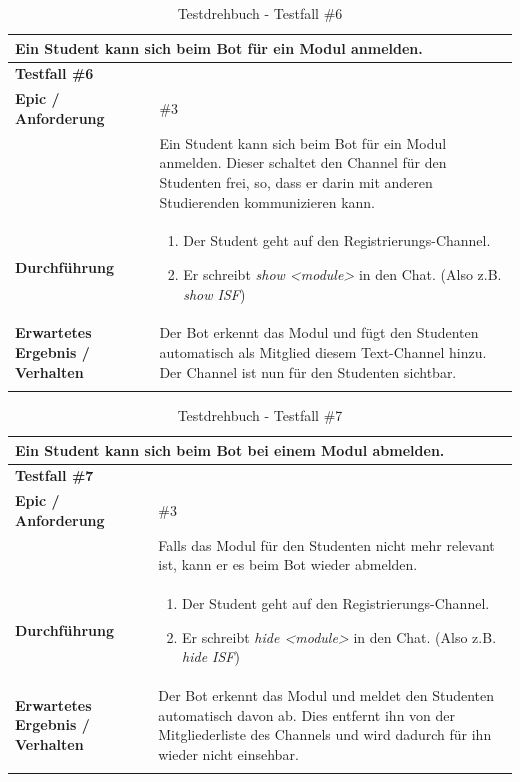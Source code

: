 \documentclass[a4paper, table]{article}
\begin{document}
\begin{longtable}[h]{|p{15em}|p{25em}|}
    \hline
    \multicolumn{2}{|l|}{\textbf{Ein Student kann sich beim Bot für ein Modul anmelden.}} \\
    \hline
    \multicolumn{2}{|l|}{\textbf{Testfall \#6}} \\
    \hline
    \textbf{Epic / Anforderung} & \#3 \\*
     & Ein Student kann sich beim Bot für ein Modul anmelden.
     Dieser schaltet den Channel für den Studenten frei, so, dass er darin mit anderen Studierenden kommunizieren kann. \\
    \hline
    \textbf{Durchführung} &
    \begin{enumerate}
        \item Der Student geht auf den Registrierungs-Channel.
        \item Er schreibt \textit{show <module>} in den Chat. (Also z.B. \textit{show ISF})
    \end{enumerate}\\
    \hline
    \textbf{Erwartetes Ergebnis / Verhalten} & Der Bot erkennt das Modul und fügt den Studenten automatisch als Mitglied diesem Text-Channel hinzu.
    Der Channel ist nun für den Studenten sichtbar. \\
    \hline
    \caption{Testdrehbuch - Testfall \#6}
\end{longtable}

\begin{longtable}[h]{|p{15em}|p{25em}|}
    \hline
    \multicolumn{2}{|l|}{\textbf{Ein Student kann sich beim Bot bei einem Modul abmelden.}} \\
    \hline
    \multicolumn{2}{|l|}{\textbf{Testfall \#7}} \\
    \hline
    \textbf{Epic / Anforderung} & \#3 \\*
     & Falls das Modul für den Studenten nicht mehr relevant ist, kann er es beim Bot wieder abmelden. \\
    \hline
    \textbf{Durchführung} &
    \begin{enumerate}
        \item Der Student geht auf den Registrierungs-Channel.
        \item Er schreibt \textit{hide <module>} in den Chat. (Also z.B. \textit{hide ISF})
    \end{enumerate}\\
    \hline
    \textbf{Erwartetes Ergebnis / Verhalten} & Der Bot erkennt das Modul und meldet den Studenten automatisch davon ab.
    Dies entfernt ihn von der Mitgliederliste des Channels und wird dadurch für ihn wieder nicht einsehbar. \\
    \hline
    \caption{Testdrehbuch - Testfall \#7}
\end{longtable}
\end{document}
